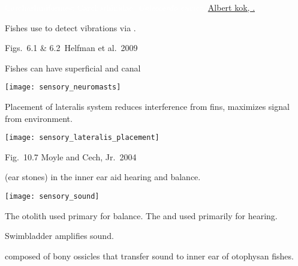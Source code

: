\documentclass[t]{beamer}
\begin{document}

{
\begin{frame}

\vfill

\tinyfill\textcolor{white}{Carcharhiniformes: Carcharhinidae: \textit{Galeocerdo cuvier,} \href{https://commons.wikimedia.org/w/index.php?curid=7737291}{Albert kok, .}}

\end{frame}
}

{
\begin{frame}[t]{Fishes use  to detect vibrations via .}


\vfilll

\tinyfill Figs.~6.1 \& 6.2 \textcopyright\,Helfman et al.~2009

\end{frame}
}


\begin{frame}[t]{Fishes can have superficial and canal }

\texttt{[image: sensory\_neuromasts]}

\end{frame}


\begin{frame}[t]{Placement of lateralis system reduces interference from fins, maximizes signal from environment.}

\texttt{[image: sensory\_lateralis\_placement]}

\vfilll

\tinyfill Fig.~10.7 Moyle and Cech, Jr.~2004
\end{frame}


\begin{frame}[t]{ (ear stones) in the inner ear aid hearing and balance.}

\vspace{-\baselineskip}
\begin{multicols}{2}

\texttt{[image: sensory\_sound]}

\columnbreak

The  otolith used primary for balance. The  and  used primarily for hearing.

\vspace{3\baselineskip}

Swimbladder amplifies sound.

\vspace{3\baselineskip}

 composed of bony ossicles that transfer sound to inner ear of otophysan fishes.

\end{multicols}

\end{frame}
\end{document}
